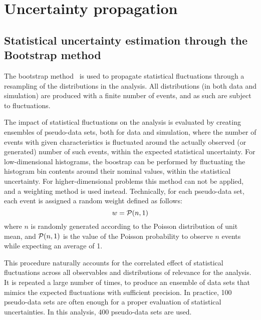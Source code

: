 \section{Uncertainty propagation}
\label{sec:errprop}

\subsection{Statistical uncertainty estimation through the Bootstrap method}
The bootstrap method~\cite{efron1979} is used to propagate statistical fluctuations through a resampling of the distributions in the analysis. All distributions (in both data and simulation) are produced with a finite number of events, and as such are subject to fluctuations.

The impact of statistical fluctuations on the analysis is evaluated by creating ensembles of pseudo-data sets, both for data and simulation, where the number of events with given characteristics is fluctuated around the actually observed (or generated) number of such events, within the expected statistical uncertainty. For low-dimensional histograms, the boostrap can be performed by fluctuating the histogram bin contents around their nominal values, within the statistical uncertainty. For higher-dimensional problems this method can not be applied, and a weighting method is used instead. Technically, for each pseudo-data set, each event is assigned a random weight defined as follows:
\begin{equation}
w = {\cal P}(n,1)
\end{equation}
where $n$ is randomly generated according to the Poisson distribution of unit mean, and ${\cal P}(n,1)$ is the value of the Poisson probability to observe $n$ events while expecting an average of 1.

This procedure naturally accounts for the correlated effect of statistical fluctuations across all observables and distributions of relevance for the analysis. It is repeated a large number of times, to produce an ensemble of data sets that mimics the expected fluctuations with sufficient precision. In practice, 100 pseudo-data sets are often enough for a proper evaluation of statistical uncertainties. In this analysis, 400 pseudo-data sets are used.

